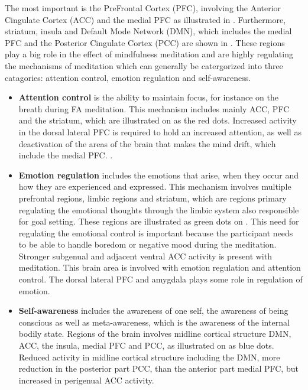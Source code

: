 The most important is the PreFrontal Cortex (PFC), involving the Anterior Cingulate Cortex (ACC) and the medial PFC as illustrated in . Furthermore, striatum, insula and Default Mode Network (DMN), which includes the medial PFC and the Posterior Cingulate Cortex (PCC) are shown in . These regions play a big role in the effect of mindfulness meditation and are highly regulating the mechanisms of meditation which can generally be catergorized into three catagories: attention control, emotion regulation and self-awareness. 

  
\begin{itemize}
	\item \textbf{Attention control} is the ability to maintain focus, for instance on the breath during FA meditation. This mechanism includes mainly ACC, PFC and the striatum, which are illustrated on  as the red dots. Increased activity in the dorsal lateral PFC is required to hold an increased attention, as well as deactivation of the areas of the brain that makes the mind drift, which include the medial PFC. \cite{Tang2017}.
	\item \textbf{Emotion regulation}
	includes the emotions that arise, when they occur and how they are experienced and expressed. This mechanism involves multiple prefrontal regions, limbic regions and striatum, which are regions primary regulating the emotional thoughts through the limbic system also responsible for goal setting. These regions are illustrated as green dots on . This need for regulating the emotional control is important because the participant needs to be able to handle boredom or negative mood during the meditation. Stronger subgenual and adjacent ventral ACC activity is present with meditation. This brain area is involved with emotion regulation and attention control. The dorsal lateral PFC and amygdala plays some role in regulation of emotion. 
	\item \textbf{Self-awareness} includes the awareness of one self, the awareness of being conscious as well as meta-awareness, which is the awareness of the internal bodily state. Regions of the brain involves midline cortical structure DMN, ACC, the insula, medial PFC and PCC, as illustrated on  as blue dots. Reduced activity in midline cortical structure including the DMN, more reduction in the posterior part PCC, than the anterior part medial PFC, but increased in perigenual ACC activity.
\end{itemize}


